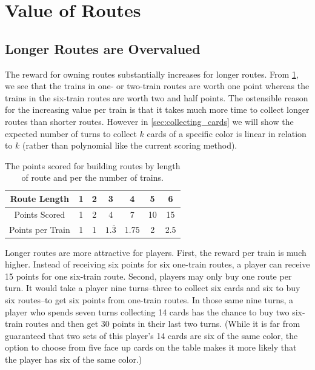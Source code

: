\newpage
\section{Value of Routes}
\subsection{Longer Routes are Overvalued}\label{sec:overvalued}
The reward for owning routes substantially increases for longer routes.
From \cref{table:current_value},
we see that the trains in one- or two-train routes are worth one point
whereas the trains in the six-train routes are worth two and half points.
The ostensible reason for the increasing value per train is that
it takes much more time to collect longer routes than shorter routes.
However in \cref{sec:collecting_cards} we will show the expected 
number of turns to collect $k$ cards of a specific
color is linear in relation to $k$
(rather than polynomial like the current scoring method).

\begin{table}[H]
\renewcommand{\arraystretch}{1.5}
\centering
\begin{tabular}{| c | c | c | c | c | c | c |}
\hline
 Route Length & 1 & 2 & 3 & 4 & 5 & 6\\
 \hline
 Points Scored & 1 & 2 & 4 & 7 & 10 & 15\\
 \hline
 Points per Train & 1 & 1 & $1.\overline{3}$ & 1.75 & 2 & 2.5\\
 \hline
\end{tabular}
\caption{The points scored for building routes by length of route
and per the number of trains.}
\label{table:current_value}
\end{table}

Longer routes are more attractive for players.
First, the reward per train is much higher.
Instead of receiving six points for six one-train routes,
a player can receive 15 points for one six-train route.
Second, players may only buy one route per turn.
It would take a player nine turns--three to collect six cards 
and six to buy six routes--to get six points from one-train routes.
In those same nine turns, a player who spends seven turns collecting
14 cards has the chance to buy two six-train routes
and then get 30 points in their last two turns.
(While it is far from guaranteed that two sets of this player's 14 cards are
six of the same color, the option to choose from five face up cards
on the table makes it more likely that the player has six of the same color.)

